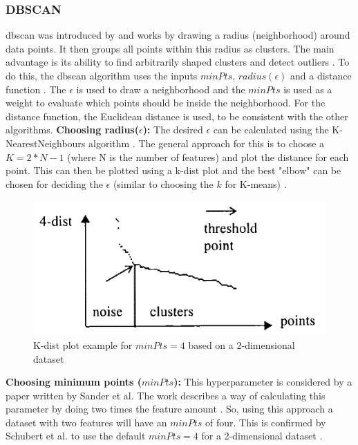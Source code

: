 \subsubsection{DBSCAN} \label{theory:clustering-dbscan}
\gls{dbscan} was introduced by \citep{ester_density-based_nodate} and works by drawing a radius (neighborhood) around data points.
It then groups all points within this radius as clusters. The main advantage is its ability to find arbitrarily shaped clusters and detect outliers \citep{liu_privacy_2012}.
To do this, the \gls{dbscan} algorithm uses the inputs $minPts$, $radius(\epsilon)$ and a distance function \citep{schubert_dbscan_2017}.
The $\epsilon$ is used to draw a neighborhood and the $minPts$ is used as a weight to evaluate which points should be inside the neighborhood.
For the distance function, the Euclidean distance is used, to be consistent with the other algorithms. \newline
\textbf{Choosing radius($\epsilon$):} The desired $\epsilon$ can be calculated using the K-NearestNeighbours algorithm \citep{ester_density-based_nodate,schubert_dbscan_2017}.
The general approach for this is to choose a $K = 2*N - 1$ (where N is the number of features) and plot the distance for each point.
This can then be plotted using a k-dist plot and the best "elbow" can be chosen for deciding the $\epsilon$ (similar to choosing the $k$ for K-means) \citep{elbatta_dynamic_2013}.
\begin{figure}[H]
  \includegraphics{TheorethicalFramework/K-dist-elbow.png}
  \caption{K-dist plot example for $minPts = 4$ based on a 2-dimensional dataset \citep{ester_density-based_nodate}}
  \label{k-dist-plot}
\end{figure}
\textbf{Choosing minimum points ($minPts$):} This hyperparameter is considered by a paper written by Sander et al.
The work describes a way of calculating this parameter by doing two times the feature amount \citep{sander_density-based_1998}.
So, using this approach a dataset with two features will have an $minPts$ of four.
This is confirmed by Schubert et al. to use the default $minPts = 4$ for a 2-dimensional dataset \citep{schubert_dbscan_2017}. \newline

